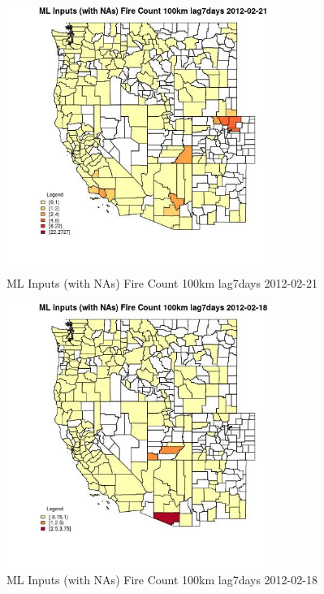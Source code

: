 \begin{figure} 
\centering  
\includegraphics[width=0.77\textwidth]{Code_Outputs/Report_ML_input_PM25_Step4_part_f_de_duplicated_aves_prioritize_24hr_obswNAs_CountyFire_Count_100km_lag7daysMean2012-02-21.jpg} 
\caption{\label{fig:Report_ML_input_PM25_Step4_part_f_de_duplicated_aves_prioritize_24hr_obswNAsCountyFire_Count_100km_lag7daysMean2012-02-21}ML Inputs (with NAs) Fire Count 100km lag7days 2012-02-21} 
\end{figure} 
 

\begin{figure} 
\centering  
\includegraphics[width=0.77\textwidth]{Code_Outputs/Report_ML_input_PM25_Step4_part_f_de_duplicated_aves_prioritize_24hr_obswNAs_CountyFire_Count_100km_lag7daysMean2012-02-18.jpg} 
\caption{\label{fig:Report_ML_input_PM25_Step4_part_f_de_duplicated_aves_prioritize_24hr_obswNAsCountyFire_Count_100km_lag7daysMean2012-02-18}ML Inputs (with NAs) Fire Count 100km lag7days 2012-02-18} 
\end{figure} 
 

